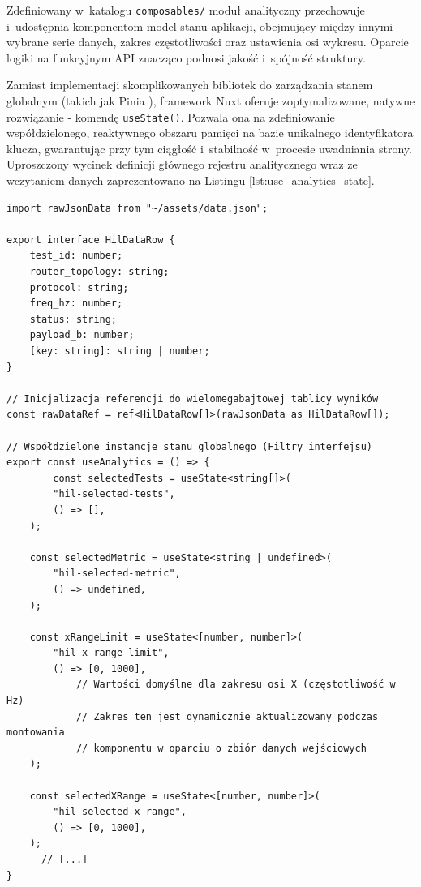 Zdefiniowany w~katalogu \texttt{composables/} moduł analityczny przechowuje i~udostępnia komponentom model stanu aplikacji, obejmujący między innymi wybrane serie danych, zakres częstotliwości oraz ustawienia osi wykresu.
Oparcie logiki na funkcyjnym API znacząco podnosi jakość i~spójność struktury.

Zamiast implementacji skomplikowanych bibliotek do zarządzania stanem globalnym (takich jak Pinia \cite{pinia_introduction}), framework Nuxt oferuje zoptymalizowane, natywne rozwiązanie - komendę \texttt{useState()}.
Pozwala ona na zdefiniowanie współdzielonego, reaktywnego obszaru pamięci na bazie unikalnego identyfikatora klucza, gwarantując przy tym ciągłość i~stabilność w~procesie uwadniania strony.
Uproszczony wycinek definicji głównego rejestru analitycznego wraz ze wczytaniem danych zaprezentowano na Listingu \ref{lst:use_analytics_state}.

\begin{listing}[htbp]
	\caption{Wyizolowany moduł analityczny definiujący globalny stan z~wykorzystaniem funkcji \texttt{useState} (\texttt{useAnalytics.ts}) \cite{espy_nexus_nuxt_dashboard}.}
	\label{lst:use_analytics_state}
	\begin{verbatim}
import rawJsonData from "~/assets/data.json";

export interface HilDataRow {
    test_id: number;
    router_topology: string;
    protocol: string;
    freq_hz: number;
    status: string;
    payload_b: number;
    [key: string]: string | number;
}

// Inicjalizacja referencji do wielomegabajtowej tablicy wyników
const rawDataRef = ref<HilDataRow[]>(rawJsonData as HilDataRow[]);

// Współdzielone instancje stanu globalnego (Filtry interfejsu)
export const useAnalytics = () => {
		const selectedTests = useState<string[]>(
		"hil-selected-tests",
		() => [],
	);

	const selectedMetric = useState<string | undefined>(
		"hil-selected-metric",
		() => undefined,
	);

	const xRangeLimit = useState<[number, number]>(
		"hil-x-range-limit",
		() => [0, 1000],
            // Wartości domyślne dla zakresu osi X (częstotliwość w Hz)
            // Zakres ten jest dynamicznie aktualizowany podczas montowania
            // komponentu w oparciu o zbiór danych wejściowych
	);

	const selectedXRange = useState<[number, number]>(
		"hil-selected-x-range",
		() => [0, 1000],
	);
      // [...]
}
    
\end{verbatim}
\end{listing}


